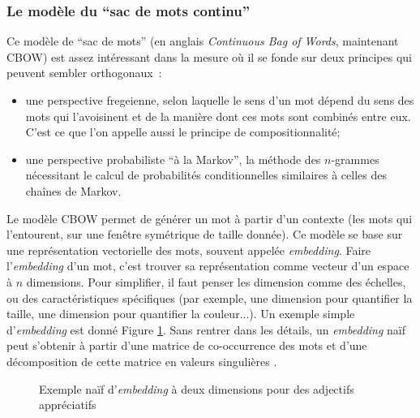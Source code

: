 \documentclass{article}
\begin{document}
			\subsubsection{Le modèle du ``sac de mots continu''}\label{cbow}
				Ce modèle de ``sac de mots'' (en anglais \textit{Continuous Bag of Words}, maintenant CBOW) est assez intéressant dans la mesure où il se fonde sur deux principes qui peuvent sembler orthogonaux~:
				\begin{itemize}
					\item une perspective fregeienne, selon laquelle le sens d'un mot dépend du sens des mots qui l'avoisinent et de la manière dont ces mots sont combinés entre eux. C'est ce que l'on appelle aussi le principe de compositionnalité;
					\item une perspective probabiliste ``à la Markov'', la méthode des $n$-grammes nécessitant le calcul de probabilités conditionnelles similaires à celles des chaînes de Markov.
				\end{itemize}
				Le modèle CBOW permet de générer un mot à partir d'un contexte (les mots qui l'entourent, sur une fenêtre symétrique de taille donnée). Ce modèle se base sur une représentation vectorielle des mots, souvent appelée \textit{embedding}. Faire l'\textit{embedding} d'un mot, c'est trouver sa représentation comme vecteur d'un espace à $n$ dimensions. Pour simplifier, il faut penser les dimension comme des échelles, ou des caractéristiques spécifiques (par exemple, une dimension pour quantifier la taille, une dimension pour quantifier la couleur...). Un exemple simple d'\textit{embedding} est donné Figure \ref{embedding}. Sans rentrer dans les détails, un \textit{embedding} naïf peut s'obtenir à partir d'une matrice de co-occurrence des mots et d'une décomposition de cette matrice en valeurs singulières \cite{socher2016}.
				\begin{figure}
					\centering
				\caption{Exemple naïf d'\textit{embedding} à deux dimensions pour des adjectifs appréciatifs}
				\label{embedding}
				\end{figure}
\end{document}
